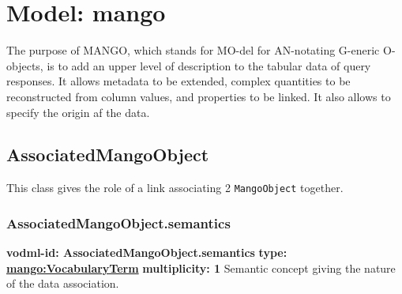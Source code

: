 
%



    
    
    
    
    
    
      

\pagebreak
\section{Model: mango }
  

  The purpose of MANGO, which stands for MO-del for AN-notating G-eneric O-objects, is to add an upper level of description to the tabular data of query responses. It allows metadata to be extended, complex quantities to be reconstructed from column values, and properties to be linked. It also allows to specify the origin af the data.

  \subsection{AssociatedMangoObject}
  \label{sect:AssociatedMangoObject}
    This class gives the role of a link associating 2 \texttt{MangoObject} together.

    \subsubsection{AssociatedMangoObject.semantics}
      \textbf{vodml-id: AssociatedMangoObject.semantics} \newline
      \textbf{type: \hyperref[sect:VocabularyTerm]{mango:VocabularyTerm}} \newline
      \textbf{multiplicity: 1} \newline
      Semantic concept giving the nature of the data association.

